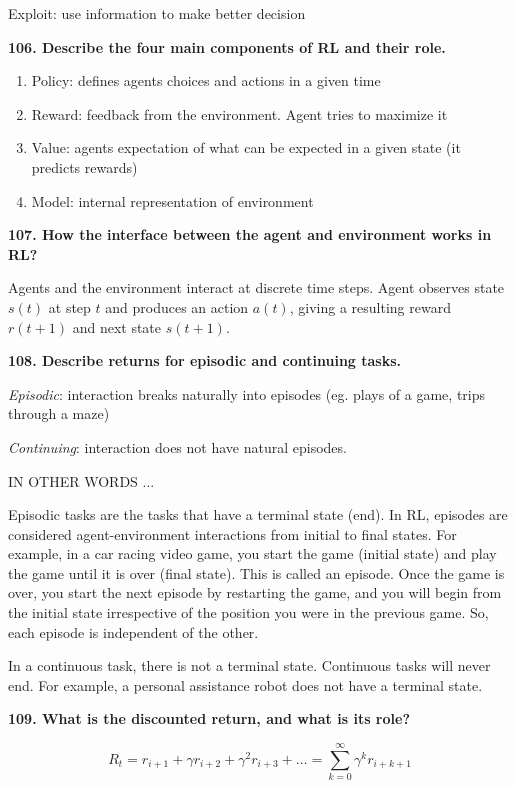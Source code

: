 Exploit: use information to make better decision

\textbf{106. Describe the four main components of RL and their role.}

\begin{enumerate}
\def\labelenumi{\arabic{enumi}.}
\item Policy: defines agents choices and actions in a given time
\item Reward: feedback from the environment. Agent tries to maximize it
\item Value: agents expectation of what can be expected in a given state (it
  predicts rewards)
\item Model: internal representation of environment
\end{enumerate}

\textbf{107. How the interface between the agent and environment works
in RL?}

Agents and the environment interact at discrete time steps. Agent
observes state $s(t)$ at step $t$ and produces an action $a(t)$,
giving a resulting reward $r(t + 1)$ and next state $s(t + 1)$.

\textbf{108. Describe returns for episodic and continuing tasks.}

\textit{Episodic}: interaction breaks naturally into episodes (eg.
plays of a game, trips through a maze)

\textit{Continuing}: interaction does not have natural episodes.

IN OTHER WORDS ...

Episodic tasks are the tasks that have a terminal state (end). In RL,
episodes are considered agent-environment interactions from initial to
final states. For example, in a car racing video game, you start the
game (initial state) and play the game until it is over (final state).
This is called an episode. Once the game is over, you start the next
episode by restarting the game, and you will begin from the initial
state irrespective of the position you were in the previous game. So,
each episode is independent of the other.

In a continuous task, there is not a terminal state. Continuous tasks
will never end. For example, a personal assistance robot does not have a
terminal state.

\textbf{109. What is the discounted return, and what is its role?}

\[ R_t = r_{i+1} + \gamma r_{i+2} + \gamma^2 r_{i+3} + \dots = \sum_{k=0}^\infty \gamma^k r_{i+k+1}\]

